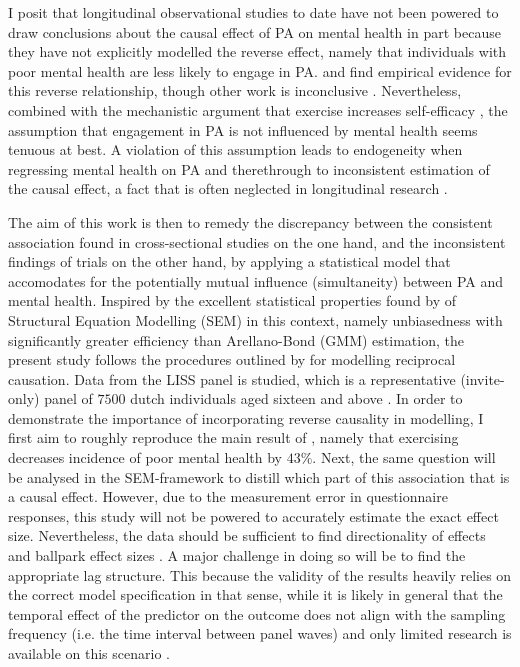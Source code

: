 \documentclass[a4paper,11pt]{report}
\begin{document}
I posit that longitudinal observational studies to date have not been powered to draw conclusions about the causal effect
of PA on mental health in part because they have not explicitly modelled the reverse effect, namely that individuals with poor
mental health are less likely to engage in PA.
 and  find empirical evidence for this reverse relationship,
though other work is inconclusive \cite{birkeland2009longitudinal, ku2012physical}. Nevertheless, combined with the
mechanistic argument that exercise increases self-efficacy \cite{smith2021role}, the assumption that engagement in PA is
not influenced by mental health seems tenuous at best.
A violation of this assumption leads to endogeneity when regressing mental health on PA and therethrough to
inconsistent estimation of the causal effect, a fact that is often neglected in longitudinal research \cite{leszczensky2022deal}.

The aim of this work is then to remedy the discrepancy between the consistent association found in cross-sectional studies
on the one hand, and the inconsistent findings of trials on the other hand, by applying a statistical model that accomodates
for the potentially mutual influence (simultaneity) between PA and mental health. Inspired by the excellent statistical
properties found by  of Structural Equation Modelling (SEM) in this context, namely
unbiasedness with significantly greater efficiency than Arellano-Bond (GMM) estimation, the present study
follows the procedures outlined by  for modelling reciprocal causation.
Data from the LISS panel is studied, which is a representative (invite-only) panel of $7500$ dutch individuals
aged sixteen and above \cite{scherpenzeel2010liss}.
In order to demonstrate the importance of incorporating reverse causality in modelling, I first aim to roughly reproduce
the main result of , namely that exercising decreases incidence of poor mental health by
$43\%$.
Next, the same question will be analysed in the SEM-framework to distill which part of this association that is a causal effect.
However, due to the measurement error in questionnaire responses, this study will not be powered to accurately estimate
the exact effect size. Nevertheless, the data should be sufficient to find directionality of effects and ballpark
effect sizes \cite{pereira2014depressive}.
A major challenge in doing so will be to find the appropriate lag structure. This because the validity of the results heavily
relies on the correct model specification in that sense, while it is likely in general that the temporal effect
of the predictor on the outcome does not align with the sampling frequency (i.e. the time interval between panel waves)
and only limited research is available on this scenario \cite{leszczensky2022deal}.
\end{document}
